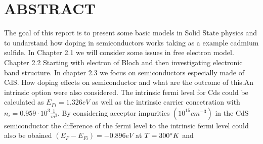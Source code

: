 \section*{ABSTRACT}
The goal of this report is to present some basic models in Solid State physics and to undarstand how doping in semiconductors works taking as a example cadmium sulfide. In Chapter 2.1 we will consider some issues in free electron model. Chapter 2.2 Starting with electron of Bloch and then investigating electronic band structure. In chapter 2.3 we focus on semiconductors especially made of CdS. How doping effects on semiconductor and what are the outcome of this.An intrinsic option were also considered. The intrinsic fermi level for Cds could be calculated
as $E_{Fi} = 1.326 eV$ as well as the intrinsic carrier concetration with
$n_i = 0.959 \cdot 10^3 \frac{1}{m^3}$. By considering acceptor impurities
$(10^{15}cm^{-3})$ in the 
CdS semiconductor the difference of the fermi level to the intrinsic fermi level 
could also be obained $(E_F-E_{Fi}) = -0.896 eV $ at $T=300\degree K$ and 